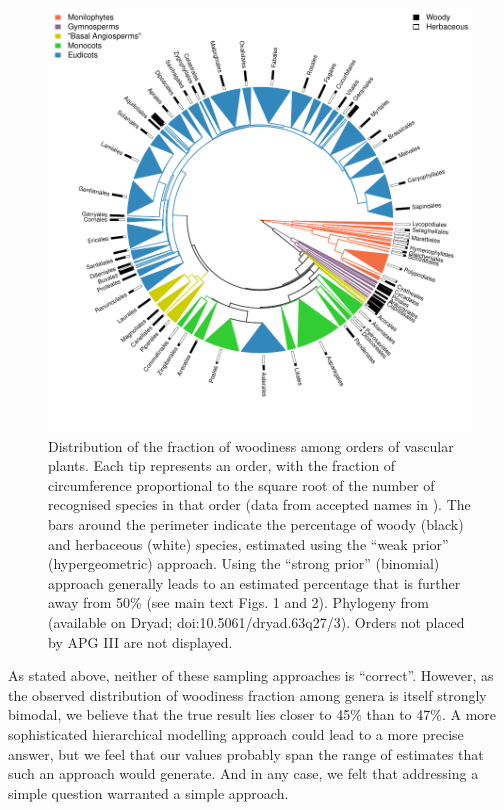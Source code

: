 \begin{figure}[p]
  \centering
  \includegraphics[width=\textwidth]{figs/fraction-on-phylogeny-supp}
  \caption[Distribution of the fraction of woodiness among orders of vascular
  plants II]{%
    Distribution of the fraction of woodiness among orders of vascular
    plants.  Each tip represents an order, with the fraction of
    circumference proportional to the square root of the number of
    recognised species in that order (data from accepted names in
    \citet{ThePlantList}).  The bars around the perimeter indicate the
    percentage of woody (black) and herbaceous (white) species,
    estimated using the ``weak prior'' (hypergeometric) approach.
    Using the ``strong prior'' (binomial) approach generally leads to
    an estimated percentage that is further away from 50\% (see
    main text Figs. 1 and 2).
    Phylogeny from \citet{Zanne} (available on Dryad;
    doi:10.5061/dryad.63q27/3). Orders not placed by APG III
    \citep{APG3} are not displayed.}
  \label{fig:phylogeny-supp}
\end{figure}

As stated above, neither of these sampling approaches is ``correct''. However,
as the observed distribution of woodiness fraction among genera is
itself strongly bimodal, we believe that the true result lies closer
to 45\% than to 47\%.  A more sophisticated hierarchical modelling
approach could lead to a more precise answer, but we feel that our
values probably span the range of estimates that such an approach
would generate. And in any case, we felt that addressing a simple question
warranted a simple approach.  

